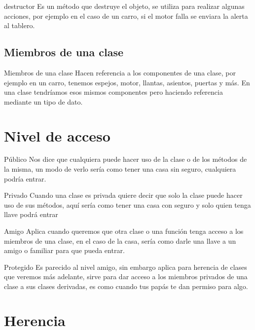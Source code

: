 \documentclass{beamer}
\begin{document}
\begin{frame}{destructor}
	Es un m\'etodo que destruye el objeto, se utiliza para realizar algunas acciones, por ejemplo en el caso de un carro, si el motor falla se enviara la alerta al tablero.
\end{frame}

\subsection{Miembros de una clase}
\begin{frame}{Miembros de una clase}
	Hacen referencia a los componentes de una clase, por ejemplo en un carro, tenemos espejos, motor, llantas, asientos, puertas y m\'as.
	En una clase tendr\'iamos esos mismos componentes pero haciendo referencia mediante un tipo de dato.
\end{frame}

\section{Nivel de acceso}

\begin{frame}{P\'ublico}
	Nos dice que cualquiera puede hacer uso de la clase o de los m\'etodos de la misma, un modo de verlo ser\'ia como tener una casa sin seguro, cualquiera podr\'ia entrar.
\end{frame}

\begin{frame}{Privado}
	Cuando una clase es privada quiere decir que solo la clase puede hacer uso de sus m\'etodos, aqu\'i ser\'ia como tener una casa con seguro y solo quien tenga llave podr\'a entrar
\end{frame}

\begin{frame}{Amigo}
	Aplica cuando queremos que otra clase o una funci\'on tenga acceso a los miembros de una clase, en el caso de la casa, ser\'ia como darle una llave a un amigo o familiar para que pueda entrar.
\end{frame}

\begin{frame}{Protegido}
	Es parecido al nivel amigo, sin embargo aplica para herencia de clases que veremos m\'as adelante, sirve para dar acceso a los miembros privados de una clase a sus clases derivadas, es como cuando tus pap\'as
	te dan permiso para algo.
\end{frame}

\section{Herencia}
\end{document}
